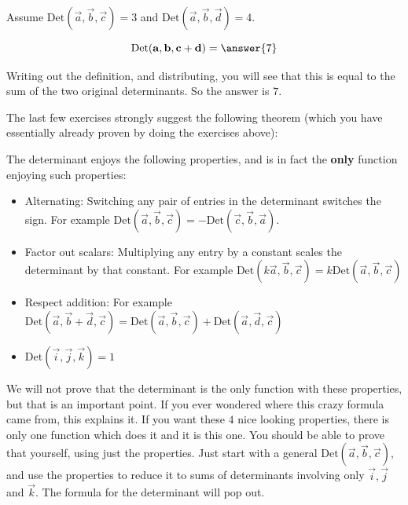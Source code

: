 \documentclass{ximera}
\begin{document}
	\begin{question}
		Assume $\textrm{Det}(\vec{a},\vec{b},\vec{c}) = 3$ and $\textrm{Det}(\vec{a},\vec{b},\vec{d}) = 4$.
		
		\[
		\textrm{Det}(\vec{a},\vec{b},\vec{c}+\vec{d}) = \answer{7}
		\]
		
		\begin{hint}
			Writing out the definition, and distributing, you will see that this is equal to the sum of the two original determinants.  So the answer is $7$.
		\end{hint}
	\end{question}
	
	The last few exercises strongly suggest the following theorem (which you have essentially already proven by doing the exercises above):
	
	\begin{theorem}
		The determinant enjoys the following properties, and is in fact the \textbf{only} function enjoying such properties:
		
		\begin{itemize}
			\item Alternating:  Switching any pair of entries in the determinant switches the sign.  For example $\textrm{Det}(\vec{a},\vec{b},\vec{c}) = -\textrm{Det}(\vec{c},\vec{b},\vec{a})$.
			\item Factor out scalars:  Multiplying any entry by a constant scales the determinant by that constant.  For example
			 $\textrm{Det}(k\vec{a},\vec{b},\vec{c}) = k\textrm{Det}(\vec{a},\vec{b},\vec{c}) $
			 
			 \item Respect addition:  For example $\textrm{Det}(\vec{a},\vec{b}+\vec{d},\vec{c}) = \textrm{Det}(\vec{a},\vec{b},\vec{c}) +\textrm{Det}(\vec{a},\vec{d},\vec{c}) $ 
			 
			 \item $\textrm{Det}(\vec{i},\vec{j},\vec{k}) = 1 $
			 \end{itemize}
			 
	\end{theorem}
	
	We will not prove that the determinant is the only function with these properties, but that is an important point.  If you ever wondered where this crazy formula came from, this explains it.  If you want these $4$ nice looking properties, there is only one function which does it and it is this one.  You should be able to prove that yourself, using just the properties.  Just start with a general $\textrm{Det}(\vec{a},\vec{b},\vec{c}) $, and use the properties to reduce it to sums of determinants involving only $\vec{i},\vec{j}$ and $\vec{k}$.  The formula for the determinant will pop out.  
	
\end{document}
